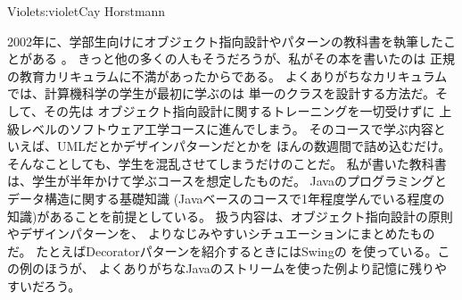 \begin{aosachapter}{Violet}{s:violet}{Cay Horstmann}

2002年に、学部生向けにオブジェクト指向設計やパターンの教科書を執筆したことがある
\cite{bib:horstmann:oodp}。
きっと他の多くの人もそうだろうが、私がその本を書いたのは
正規の教育カリキュラムに不満があったからである。
よくありがちなカリキュラムでは、計算機科学の学生が最初に学ぶのは
単一のクラスを設計する方法だ。そして、その先は
オブジェクト指向設計に関するトレーニングを一切受けずに
上級レベルのソフトウェア工学コースに進んでしまう。
そのコースで学ぶ内容といえば、UMLだとかデザインパターンだとかを
ほんの数週間で詰め込むだけ。そんなことしても、学生を混乱させてしまうだけのことだ。
私が書いた教科書は、学生が半年かけて学ぶコースを想定したものだ。
Javaのプログラミングとデータ構造に関する基礎知識
(Javaベースのコースで1年程度学んでいる程度の知識)があることを前提としている。
扱う内容は、オブジェクト指向設計の原則やデザインパターンを、
よりなじみやすいシチュエーションにまとめたものだ。
たとえばDecoratorパターンを紹介するときにはSwingの
を使っている。この例のほうが、
よくありがちなJavaのストリームを使った例より記憶に残りやすいだろう。



\end{aosachapter}

